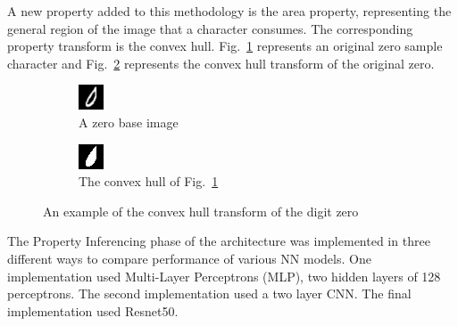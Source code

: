 \documentclass[conference]{IEEEtran}
\begin{document}
A new property added to this methodology is the area property, representing the
general region of the image that a character consumes. The corresponding
property transform is the convex hull. Fig.~\ref{fig:zero_raw} represents an
original zero sample character and Fig.~\ref{fig:zero_ch} represents the convex
hull transform of the original zero.

\begin{figure}[h]
    \centering
    \begin{subfigure}{.5\columnwidth}
        \centering
        \includegraphics[width=.50\textwidth]{./images/raw_0-0-12.png}
        \caption{A zero base image}
        \label{fig:zero_raw}
    \end{subfigure}%
    \begin{subfigure}{.5\columnwidth}
        \centering
        \includegraphics[width=.50\textwidth]{./images/ch_0-0-12.png}
        \caption{The convex hull of Fig.~\ref{fig:zero_raw}}
        \label{fig:zero_ch}
    \end{subfigure}
    \caption{An example of the convex hull transform of the digit zero}
    \label{fig:chull_example}
\end{figure}

The Property Inferencing phase of the architecture was implemented in three
different ways to compare performance of various NN models.  One implementation
used Multi-Layer Perceptrons (MLP), two hidden layers of 128 perceptrons.  The
second implementation used a two layer CNN.  The final implementation used
Resnet50.
\end{document}
